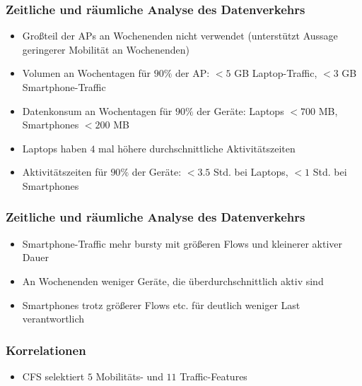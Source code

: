 \documentclass{beamer}
\begin{document}
\begin{frame}
  \frametitle{Zeitliche und räumliche Analyse des Datenverkehrs}
  \begin{itemize}
    \item Großteil der APs an Wochenenden nicht verwendet (unterstützt Aussage geringerer Mobilität an Wochenenden)
    \item Volumen an Wochentagen für $90 \%$ der AP: $<5$ \textsc{GB} Laptop-Traffic, $<3$ \textsc{GB} Smartphone-Traffic
    \item Datenkonsum an Wochentagen für $90 \%$ der Geräte: Laptops $<700$ \textsc{MB}, Smartphones $<200$ \textsc{MB}
    \item Laptops haben $4$ mal höhere durchschnittliche Aktivitätszeiten
    \item Aktivitätszeiten für $90 \%$ der Geräte: $<3.5$ Std. bei Laptops, $<1$ Std. bei Smartphones
  \end{itemize}
\end{frame}

\begin{frame}
  \frametitle{Zeitliche und räumliche Analyse des Datenverkehrs}
  \begin{itemize}
    \item Smartphone-Traffic mehr bursty mit größeren Flows und kleinerer aktiver Dauer
    \item An Wochenenden weniger Geräte, die überdurchschnittlich aktiv sind
    \item Smartphones trotz größerer Flows etc. für deutlich weniger Last verantwortlich
  \end{itemize}
\end{frame}

\begin{frame}
  \frametitle{Korrelationen}

  \begin{itemize}
    \item CFS selektiert $5$ Mobilitäts- und $11$ Traffic-Features
  \end{itemize}
  
\end{frame}



\end{document}

